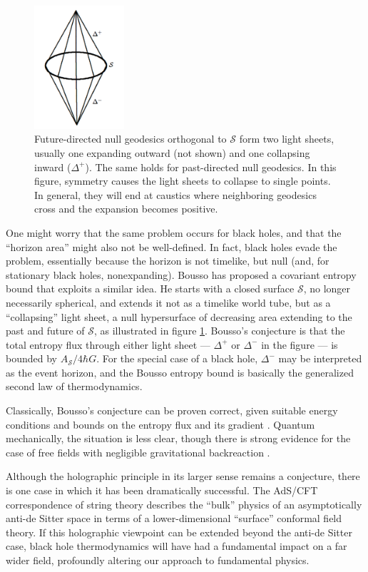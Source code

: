 \documentclass[12pt]{article}
\begin{document}
\begin{figure}
\centerline{\includegraphics[height=1.8in]{Bousso.pdf}}
\caption{Future-directed null geodesics orthogonal to
$\mathcal{S}$ form two light sheets, usually one expanding outward 
(not shown) and one collapsing inward ($\Delta^+$).  The same holds
for past-directed null geodesics.  In this figure, symmetry causes 
the light sheets to collapse to single points.  In general, they will 
end at caustics where neighboring geodesics cross 
and the expansion becomes positive.}
\label{Carlipfig4}
\end{figure}
One might worry that the same problem occurs for black holes, and that
the ``horizon area'' might also not be well-defined.  In fact, black holes
evade the problem, essentially because the horizon is not timelike, but
null (and, for stationary black holes, nonexpanding).  Bousso \cite{Boussob}
has proposed a covariant entropy bound that exploits a similar idea.
He starts with a closed surface $\mathcal{S}$, no longer necessarily
spherical, and extends it not as a timelike world tube, but
as a ``collapsing'' light sheet, a null hypersurface of decreasing area
extending to the past and future of $\mathcal{S}$, as illustrated in figure
\ref{Carlipfig4}.  Bousso's conjecture is that the total 
entropy flux through either light sheet --- $\Delta^+$ or $\Delta^-$
in the figure --- is bounded by $A_{\mathcal{S}}/4\hbar G$.  For the
special case of a black hole, $\Delta^-$ may be interpreted as the
event horizon, and the Bousso entropy bound is basically the generalized
second law of thermodynamics.

Classically, Bousso's conjecture can be proven correct, given suitable
energy conditions and bounds on the entropy flux 
and its gradient \cite{Flanagan,BoussoFlan}.  Quantum mechanically, 
the situation is less clear, though there is strong evidence for the case 
of free fields with negligible gravitational backreaction \cite{BoussoMal}.

Although the holographic principle in its larger sense remains a conjecture,
there is one case in which it has been dramatically successful.  The
AdS/CFT correspondence of string theory \cite{Malda,AGMOO} describes
the ``bulk'' physics of an asymptotically anti-de Sitter space in terms
of a lower-dimensional ``surface'' conformal field theory.  If this
holographic viewpoint can be extended beyond the anti-de Sitter case,
black hole thermodynamics will have had a fundamental impact on a far
wider field, profoundly altering our approach to fundamental physics.
\end{document}
